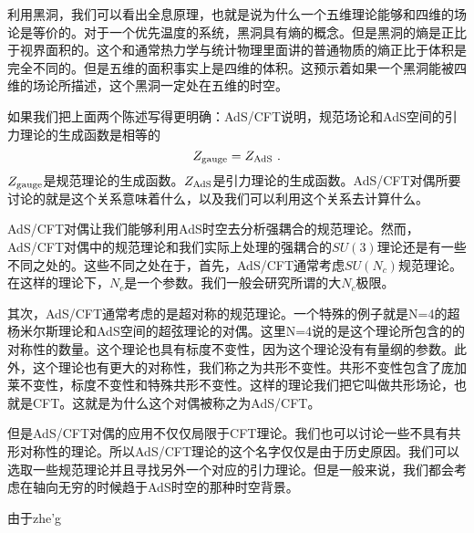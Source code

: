 利用黑洞，我们可以看出全息原理，也就是说为什么一个五维理论能够和四维的场论是等价的。对于一个优先温度的系统，黑洞具有熵的概念。但是黑洞的熵是正比于视界面积的。这个和通常热力学与统计物理里面讲的普通物质的熵正比于体积是完全不同的。但是五维的面积事实上是四维的体积。这预示着如果一个黑洞能被四维的场论所描述，这个黑洞一定处在五维的时空。

如果我们把上面两个陈述写得更明确：AdS/CFT说明，规范场论和AdS空间的引力理论的生成函数是相等的
\begin{equation}
Z_{\rm gauge}=Z_{\rm AdS}~.
\end{equation}
$Z_{\rm gauge}$是规范理论的生成函数。$Z_{\rm AdS}$是引力理论的生成函数。AdS/CFT对偶所要讨论的就是这个关系意味着什么，以及我们可以利用这个关系去计算什么。

AdS/CFT对偶让我们能够利用AdS时空去分析强耦合的规范理论。然而，AdS/CFT对偶中的规范理论和我们实际上处理的强耦合的$SU(3)$理论还是有一些不同之处的。这些不同之处在于，首先，AdS/CFT通常考虑$SU(N_c)$规范理论。在这样的理论下，$N_c$是一个参数。我们一般会研究所谓的大$N_c$极限。

其次，AdS/CFT通常考虑的是超对称的规范理论。一个特殊的例子就是N=4的超杨米尔斯理论和AdS空间的超弦理论的对偶。这里N=4说的是这个理论所包含的的对称性的数量。这个理论也具有标度不变性，因为这个理论没有有量纲的参数。此外，这个理论也有更大的对称性，我们称之为共形不变性。共形不变性包含了庞加莱不变性，标度不变性和特殊共形不变性。这样的理论我们把它叫做共形场论，也就是CFT。这就是为什么这个对偶被称之为AdS/CFT。

但是AdS/CFT对偶的应用不仅仅局限于CFT理论。我们也可以讨论一些不具有共形对称性的理论。所以AdS/CFT理论的这个名字仅仅是由于历史原因。我们可以选取一些规范理论并且寻找另外一个对应的引力理论。但是一般来说，我们都会考虑在轴向无穷的时候趋于AdS时空的那种时空背景。

由于zhe'g

